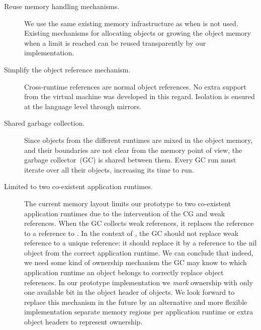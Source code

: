 \begin{description}
	\item[Reuse memory handling mechanisms.] We use the same existing memory infrastructure as when \Vtt is not used. Existing mechanisms for allocating objects or growing the object memory when a limit is reached can be reused transparently by our implementation. 
	\item[Simplify the object reference mechanism.] Cross-runtime references are normal object references. No extra support from the virtual machine was developed in this regard. Isolation is ensured at the language level through mirrors.
	\item[Shared garbage collection.] Since objects from the different runtimes are mixed in the object memory, and their boundaries are not clear from the memory point of view, the garbage collector~(GC) is shared between them. Every GC run must iterate over all their objects, increasing its time to run.
	\item[Limited to two co-existent application runtimes.] The current memory layout limits our prototype to two co-existent application runtimes due to the intervention of the CG and weak references. When the GC collects weak references, it replaces the reference to a reference to . In the context of \Vtt, the GC should not replace weak reference to a unique  reference: it should replace it by a reference to the nil object from the correct application runtime. We can conclude that indeed, we need some kind of ownership mechanism \ie the GC may know to which application runtime an object belongs to correctly replace object references. In our prototype implementation we \emph{mark} ownership with only one available bit in the object header of objects. We look forward to replace this mechanism in the future by an alternative and more flexible implementation \eg separate memory regions per application runtime or extra object headers to represent ownership.
\end{description}



